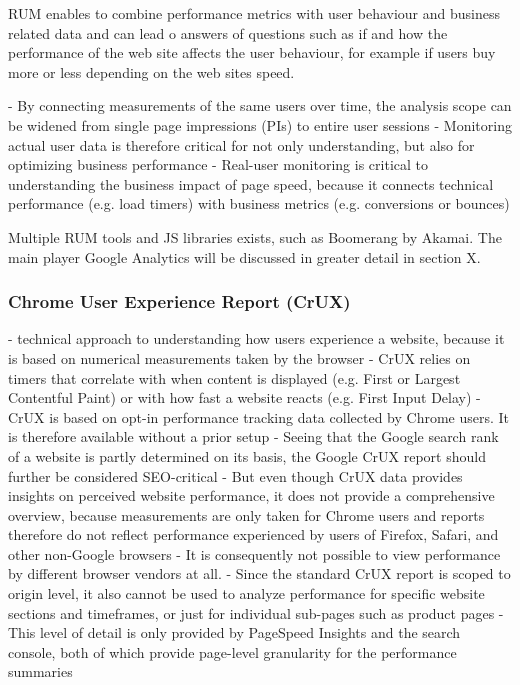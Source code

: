 RUM enables to combine performance metrics with user behaviour and business related data and can lead o answers of questions such as if and how the performance of the web site affects the user behaviour, for example if users buy more or less depending on the web sites speed.%


- By connecting measurements of the same users over time, the analysis scope can be widened from single page impressions (PIs) to entire user sessions
- Monitoring actual user data is therefore critical for not only understanding, but also for optimizing business performance
- Real-user monitoring is critical to understanding the business impact of page speed, because it connects technical performance (e.g. load timers) with business metrics (e.g. conversions or bounces)





Multiple RUM tools and JS libraries exists, such as Boomerang by Akamai.
The main player Google Analytics will be discussed in greater detail in section X.









\subsubsection{Chrome User Experience Report (CrUX)}


- technical approach to understanding how users experience a website, because it is based on numerical measurements taken by the browser
- CrUX relies on timers that correlate with when content is displayed (e.g. First or Largest Contentful Paint) or with how fast a website reacts (e.g. First Input Delay)
- CrUX is based on opt-in performance tracking data collected by Chrome users. It is therefore available without a prior setup
-  Seeing that the Google search rank of a website is partly determined on its basis, the Google CrUX report should further be considered SEO-critical
- But even though CrUX data provides insights on perceived website performance, it does not provide a comprehensive overview, because measurements are only taken for Chrome users and reports therefore do not reflect performance experienced by users of Firefox, Safari, and other non-Google browsers
- It is consequently not possible to view performance by different browser vendors at all.
- Since the standard CrUX report is scoped to origin level, it also cannot be used to analyze performance for specific website sections and timeframes, or just for individual sub-pages such as product pages
- This level of detail is only provided by PageSpeed Insights and the search console, both of which provide page-level granularity for the performance summaries



